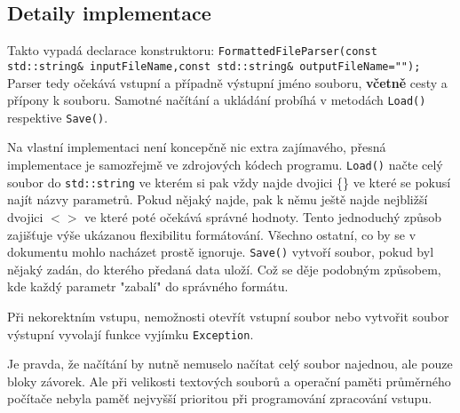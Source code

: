 \subsection{Detaily implementace}
Takto vypadá declarace konstruktoru: \lstinline|FormattedFileParser(const std::string& inputFileName,const std::string& outputFileName="");|
Parser tedy očekává vstupní a případně výstupní jméno souboru,\textbf{ včetně} cesty a přípony k souboru. Samotné načítání a ukládání probíhá v metodách \texttt{Load()} respektive \texttt{Save()}.

Na vlastní implementaci není koncepčně nic extra zajímavého, přesná implementace je samozřejmě ve zdrojových kódech programu. \texttt{Load()} načte celý soubor do \texttt{std::string} ve kterém si pak vždy najde dvojici \{\} ve které se pokusí najít názvy parametrů. Pokud nějaký najde, pak k němu ještě najde nejbližší dvojici $ <> $  ve které poté očekává správné hodnoty. Tento jednoduchý způsob zajišťuje výše ukázanou flexibilitu formátování. Všechno ostatní, co by se v dokumentu mohlo nacházet prostě ignoruje. \texttt{Save()} vytvoří soubor, pokud byl nějaký zadán, do kterého předaná data uloží. Což se děje podobným způsobem, kde každý parametr "zabalí" do správného formátu.

Při nekorektním vstupu, nemožnosti otevřít vstupní soubor nebo vytvořit soubor výstupní vyvolají funkce vyjímku \texttt{Exception}.

Je pravda, že načítání by nutně nemuselo načítat celý soubor najednou, ale pouze  bloky závorek. Ale při velikosti textových souborů a operační paměti průměrného počítače nebyla paměť nejvyšší prioritou při programování zpracování vstupu.
